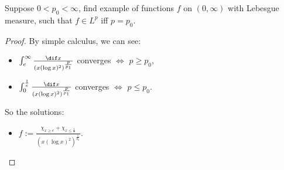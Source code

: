 \begin{exc}
    Suppose $0<p_0<\infty$, find example of functions $f$ 
    on $(0,\infty)$ with Lebesgue measure, such that $f\in L^{p}$ 
    iff $p=p_{0}$.
\end{exc}
\begin{proof}
    By simple calculus, we can see:
    \begin{itemize}
        \item $\int_{e}^{\infty}\frac{\dif x}{\left(x(\log x)^{2}\right)^{\frac{p}{p_{1}}}}$ 
        converges $\Leftrightarrow$ $p\ge p_{0}$,
        \item $\int_{0}^{\frac{1}{e}}\frac{\dif x}{\left(x(\log x)^{2}\right)^{\frac{p}{p_{1}}}}$ 
        converges $\Leftrightarrow$ $p\le p_{0}$.
    \end{itemize}
    So the solutions:
    \begin{itemize}
        \item $f:=\frac{\chi_{x\ge e}+\chi_{x\le\frac{1}{e}}}
        {(x(\log x)^{2})^{\frac{1}{p_0}}}$.
    \end{itemize}
\end{proof}
